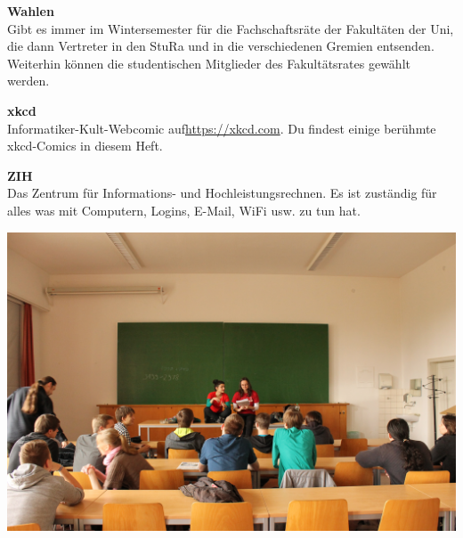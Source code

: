 \textbf{Wahlen} \\
Gibt es immer im Wintersemester für die Fachschaftsräte der Fakultäten der Uni, die dann Vertreter in den StuRa und in die verschiedenen Gremien entsenden.
Weiterhin können die studentischen Mitglieder des Fakultätsrates gewählt werden.

\textbf{xkcd} \\
Informatiker-Kult-Webcomic auf\linebreak \url{https://xkcd.com}. Du findest einige berühmte xkcd-Comics in diesem Heft.

\textbf{ZIH} \\
Das Zentrum für Informations- und Hochleistungsrechnen.
Es ist zuständig für alles was mit Computern, Logins, E-Mail, WiFi usw. zu tun hat.

\vfill
\includegraphics[width=2\linewidth]{img/ese2013/tutorium.jpg}

\onecolumn
